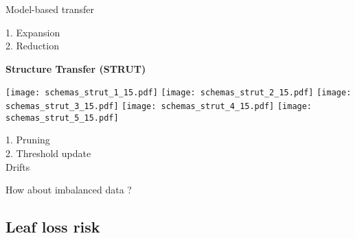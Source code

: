 \begin{frame}{Model-based transfer}
\begin{minipage}[t]{0.49\linewidth}
    \pause \pause
    \textcolor{myblue}{1. Expansion}\\
    \pause
    \textcolor{myorange}{2. Reduction}\\
    \smallskip

\end{minipage}\hfill
\begin{minipage}[t]{0.49\linewidth}
    \vspace{0pt}
    \centering
    \pause \pause
    \textbf{Structure Transfer (STRUT)}
    
    \renewcommand{\ratio}{0.55}
    \begin{overprint}
        \centering\texttt{[image: schemas\_strut\_1\_15.pdf]}
        \centering\texttt{[image: schemas\_strut\_2\_15.pdf]}
        \centering\texttt{[image: schemas\_strut\_3\_15.pdf]}
        \centering\texttt{[image: schemas\_strut\_4\_15.pdf]}
        \centering\texttt{[image: schemas\_strut\_5\_15.pdf]}
    \end{overprint}
    \textcolor{myorange}{1. Pruning}\\
    \textcolor{myblue}{2. Threshold update}\\
    \smallskip
    Drifts
\end{minipage}

\centering
\medskip
\pause[12]
\textcolor{myblue}{How about imbalanced data ?}

\end{frame}

\subsection{Leaf loss risk}

